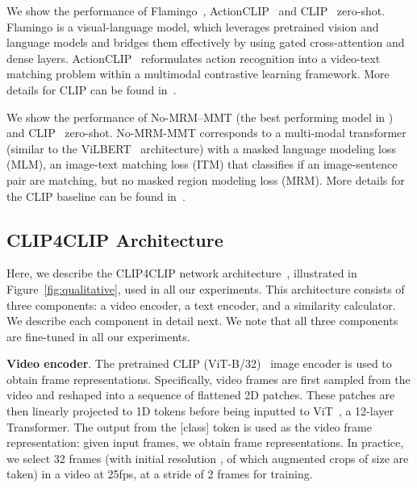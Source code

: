  We show the performance of Flamingo~\cite{flamingo}, ActionCLIP~\cite{actionclip} and CLIP~\cite{Radford2021CLIP} zero-shot. Flamingo is a visual-language model, which leverages pretrained vision and language models and bridges them effectively by using gated cross-attention and dense layers.  ActionCLIP~\cite{actionclip} reformulates action recognition into a video-text matching problem within a multimodal contrastive learning framework. More details for CLIP can be found in~\cite{Radford2021CLIP}. 


 We show the performance of No-MRM–MMT (the best performing model in \cite{hendricks2021probing}) and CLIP~\cite{Radford2021CLIP} zero-shot. No-MRM-MMT corresponds to a multi-modal transformer (similar to the ViLBERT~\cite{vilbert} architecture) with a masked language modeling loss (MLM), an image-text matching loss (ITM) that classifies if an image-sentence pair are matching, but no masked region modeling loss (MRM). More details for the CLIP baseline can be found in~\cite{Radford2021CLIP}. 



\subsection{CLIP4CLIP Architecture}\label{subsec:app:clip4clip}

Here, we describe the CLIP4CLIP network architecture~\cite{Luo2021CLIP4Clip}, illustrated in Figure~\ref{fig:qualitative}, used in all our experiments. This architecture consists of three components: a video encoder, a text encoder, and a similarity calculator. We describe each component in detail next. We note that all three components are fine-tuned in all our experiments.

\noindent \textbf{Video encoder}. The pretrained CLIP (ViT-B/32)~\cite{Radford2021CLIP} image encoder is used to obtain frame representations. Specifically, video frames are first sampled from the video and reshaped into a sequence of flattened 2D patches. These patches are then linearly projected to 1D tokens before being inputted to ViT~\cite{dosovitskiy2020vit}, a 12-layer Transformer. The output from the [class] token is used as the video frame representation: given  input frames, we obtain  frame representations. In practice, we select 32 frames (with initial resolution , of which augmented crops of size  are taken) in a video at 25fps, at a stride of 2 frames for training. 

